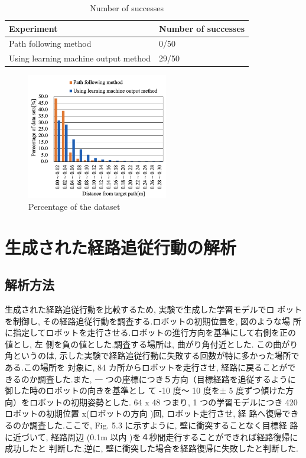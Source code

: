 \documentclass{jarticle}
\begin{document}
\begin{table}[htbp]
  \caption{Number of successes} \vspace*{2mm}\hspace*{-3mm}
    \begin{tabular}{|l|l|}
      \hline\hline
      Experiment & Number of successes \\
      \hline\hline
      Path following method & 0/50 \\
      Using learning machine output method & 29/50 \\
      \hline
    \end{tabular}
\end {table}


\begin{figure}[htbp]
  \centering
   \includegraphics[height=55mm]{./figs/data1.png}
   \caption{Percentage of the dataset}
\end{figure}


\section{生成された経路追従行動の解析}
\subsection{解析方法}
生成された経路追従行動を比較するため, 実験で生成した学習モデルでロ
ボットを制御し, その経路追従行動を調査する.ロボットの初期位置を,  図のような場
所に指定してロボットを走行させる.ロボットの進行方向を基準にして右側を正の値とし, 左
側を負の値とした.調査する場所は, 曲がり角付近とした. この曲がり角というのは, 
示した実験で経路追従行動に失敗する回数が特に多かった場所である.この場所を
対象に,  84 カ所からロボットを走行させ, 経路に戻ることができるのか調査した.また, 一
つの座標につき５方向（目標経路を追従するように御した時のロボットの向きを基準とし
て -10 度〜 10 度を± 5 度ずつ傾けた方向）をロボットの初期姿勢とした. 64 x 48 つまり,  1
つの学習モデルにつき 420 ロボットの初期位置 x(ロボットの方向 )回, ロボット走行させ, 経
路へ復帰できるのか調査した.ここで,  Fig. 5.3 に示すように, 壁に衝突することなく目標経
路に近づいて, 経路周辺 (0.1m 以内 )を４秒間走行することができれば経路復帰に成功したと
判断した.逆に, 壁に衝突した場合を経路復帰に失敗したと判断した.
\end{document}
